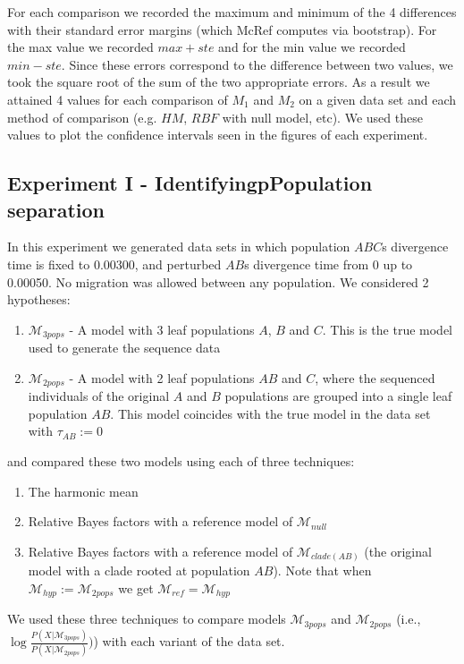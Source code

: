 \documentclass[11pt]{article}
\newcommand{\M}{\mathcal{M}}
\newcommand{\Mref}{\M_{ref}}
\newcommand{\Mhyp}{\M_{hyp}}
\newcommand{\1}{\mathbbm{1}}
\begin{document}
For each comparison we recorded the maximum and minimum of the 4 differences with their standard error margins (which McRef computes via bootstrap). 
%
For the max value we recorded $max+ste$ and for the min value we recorded $min-ste$. 
%
Since these errors correspond to the difference between two values, we took the square root of the sum of the two appropriate errors. 
%
As a result we attained 4 values for each comparison of $M_1$ and $M_2$ on a given data set and each method of comparison (e.g. $HM$, $RBF$ with null model, etc). We used these values to plot the confidence intervals seen in the figures of each experiment.


\subsection{Experiment I - IdentifyingpPopulation separation}
In this experiment we generated data sets in which population $ABC$s divergence time is fixed to 0.00300, and perturbed $AB$s divergence time from 0 up to 0.00050. No migration was allowed between any population. We considered 2 hypotheses:
%
\begin{enumerate}
\item $\M_{3pops}$ - A model with 3 leaf populations $A$, $B$ and $C$. This is the true model used to generate the sequence data
\item $\M_{2pops}$ - A model with 2 leaf populations $AB$ and $C$, where the sequenced individuals of the original $A$ and $B$ populations are grouped into a single leaf population $AB$. This model coincides with the true model in the data set with $\tau_{AB}:=0$
\end{enumerate}
%
and compared these two models using each of three techniques:
%
\begin{enumerate}
\item The harmonic mean
\item Relative Bayes factors with a reference model of $\M_{null}$
\item Relative Bayes factors with a reference model of $\M_{clade(AB)}$ (the original model with a clade rooted at population $AB$). Note that when $\Mhyp := \M_{2pops}$ we get $\Mref=\Mhyp$
\end{enumerate}


We used these three techniques to compare models $\M_{3pops}$ and $\M_{2pops}$ (i.e., $\log{\frac{P(X|\M_{3pops})}{P(X|\M_{2pops})})}$) with each variant of the data set.
\end{document}
